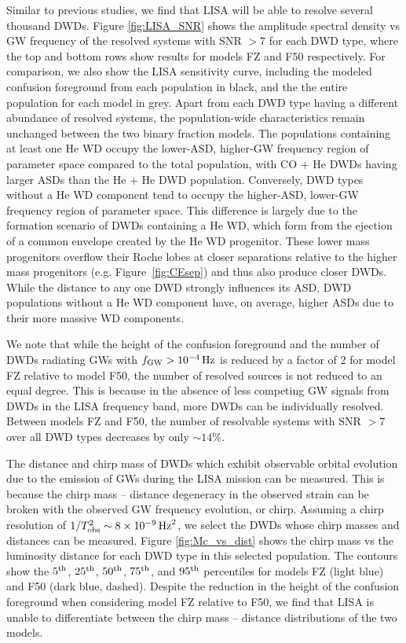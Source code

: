 \documentclass[twocolumn, linenumbers]{aastex631}
\begin{document}
Similar to previous studies, we find that LISA will be able to resolve several thousand DWDs. Figure \ref{fig:LISA_SNR} shows the amplitude spectral density vs GW frequency of the resolved systems with SNR $> 7$ for each DWD type, where the top and bottom rows show results for models FZ and F50 respectively. For comparison, we also show the LISA sensitivity curve, including the 
modeled confusion foreground from each population in black, and the the entire population for each model in grey. Apart from each DWD type having a different abundance of resolved systems, the population-wide characteristics remain unchanged between the two binary fraction models. The populations containing at least one He WD occupy the lower-ASD, higher-GW frequency region of parameter space compared to the total population, with CO + He DWDs having larger ASDs than the He + He DWD population. Conversely, DWD types without a He WD component tend to occupy the higher-ASD, lower-GW frequency region of parameter space. This difference is largely due to the formation scenario of DWDs containing a He WD, which form from the ejection of a common envelope created by the He WD progenitor. These lower mass progenitors overflow their Roche lobes at closer separations relative to the higher mass progenitors (e.g. Figure~\ref{fig:CEsep}) and thus also produce closer DWDs. While the distance to any one DWD strongly influences its ASD, DWD populations without a He WD component have, on average, higher ASDs due to their more massive WD components.

We note that while the height of the confusion foreground and the number of DWDs radiating GWs with $f_{\rm{GW}} > 10^{-4}\,\rm{Hz}$ is reduced by a factor of 2 for model FZ relative to model F50, the number of resolved sources is not reduced to an equal degree. This is because in the absence of less competing GW signals from DWDs in the LISA frequency band, more DWDs can be individually resolved. Between models FZ and F50, the number of resolvable systems with SNR $>7$ over all DWD types decreases by only $\sim14\%$. 

The distance and chirp mass of DWDs which exhibit observable orbital evolution due to the emission of GWs during the LISA mission can be measured. This is because the chirp mass -- distance degeneracy in the observed strain can be broken with the observed GW frequency evolution, or chirp. Assuming a chirp resolution of $1/T_{\rm{obs}}^2 \sim 8\times10^{-9}\,\rm{Hz}^2$, we select the DWDs whose chirp masses and distances can be measured. Figure \ref{fig:Mc_vs_dist} shows the chirp mass vs the luminosity distance for each DWD type in this selected population. The contours show the $5^{\rm{th}}$, $25^{\rm{th}}$, $50^{\rm{th}}$, $75^{\rm{th}}$, and $95^{\rm{th}}$ percentiles for models FZ (light blue) and F50 (dark blue, dashed). Despite the reduction in the height of the confusion foreground when considering model FZ relative to F50, we find that LISA is unable to differentiate between the chirp mass -- distance distributions of the two models.
\end{document}
